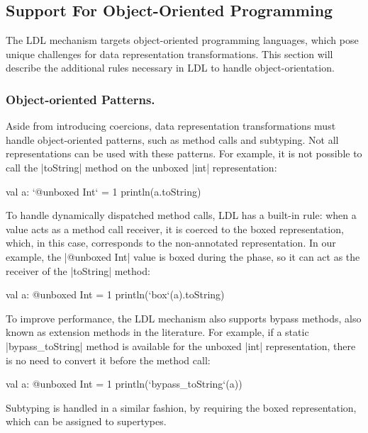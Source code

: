\subsection{Support For Object-Oriented Programming}
\label{sec:ldl:oo-patterns}

The LDL mechanism targets object-oriented programming languages, which pose unique challenges for data representation transformations. This section will describe the additional rules necessary in LDL to handle object-orientation.

\subsubsection{Object-oriented Patterns.} Aside from introducing coercions, data representation transformations must handle object-oriented patterns, such as method calls and subtyping. Not all representations can be used with these patterns. For example, it is not possible to call the |toString| method on the unboxed |int| representation:

\begin{lstlisting-nobreak}
val a: `@unboxed Int` = 1
println(a.toString)
\end{lstlisting-nobreak}

To handle dynamically dispatched method calls, LDL has a built-in rule: when a value acts as a method call receiver, it is coerced to the boxed representation, which, in this case, corresponds to the non-annotated representation. In our example, the |@unboxed Int| value is boxed during the \coerce{} phase, so it can act as the receiver of the |toString| method:

\begin{lstlisting-nobreak}
val a: @unboxed Int = 1
println(`box`(a).toString)
\end{lstlisting-nobreak}

To improve performance, the LDL mechanism also supports bypass methods, also known as extension methods in the literature. For example, if a static |bypass_toString| method is available for the unboxed |int| representation, there is no need to convert it before the method call:

\begin{lstlisting-nobreak}
val a: @unboxed Int = 1
println(`bypass_toString`(a))
\end{lstlisting-nobreak}

Subtyping is handled in a similar fashion, by requiring the boxed representation, which can be assigned to supertypes.

